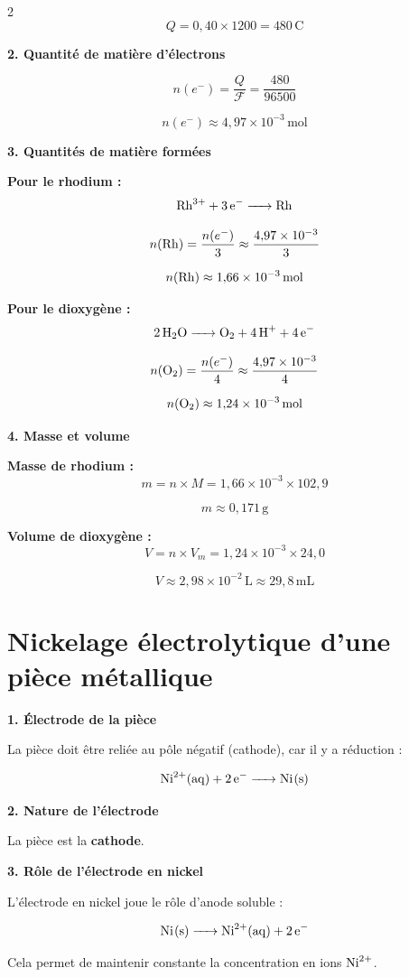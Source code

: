 \documentclass[a4paper,11pt,fleqn]{scrartcl}
\begin{document}
\begin{multicols}{2}
\[
Q = 0{,}40 \times 1200 = 480\,\text{C}
\]

\textbf{2. Quantité de matière d’électrons}

\[
n(e^-) = \frac{Q}{\mathcal{F}} = \frac{480}{96500}
\]

\[
n(e^-) \approx 4{,}97 \times 10^{-3}\,\text{mol}
\]

\textbf{3. Quantités de matière formées}

\textbf{Pour le rhodium :}
\[
\ce{Rh^{3+} + 3e^- -> Rh}
\]

\[
n(\ce{Rh}) = \frac{n(e^-)}{3} \approx \frac{4{,}97 \times 10^{-3}}{3}
\]

\[
n(\ce{Rh}) \approx 1{,}66 \times 10^{-3}\,\text{mol}
\]

\textbf{Pour le dioxygène :}
\[
\ce{2H2O -> O2 + 4H+ + 4e^-}
\]

\[
n(\ce{O2}) = \frac{n(e^-)}{4} \approx \frac{4{,}97 \times 10^{-3}}{4}
\]

\[
n(\ce{O2}) \approx 1{,}24 \times 10^{-3}\,\text{mol}
\]

\textbf{4. Masse et volume}

\textbf{Masse de rhodium :}
\[
m = n \times M = 1{,}66 \times 10^{-3} \times 102{,}9
\]

\[
m \approx 0{,}171\,\text{g}
\]

\textbf{Volume de dioxygène :}
\[
V = n \times V_m = 1{,}24 \times 10^{-3} \times 24{,}0
\]

\[
V \approx 2{,}98 \times 10^{-2}\,\text{L} \approx 29{,}8\,\text{mL}
\]

\section{Nickelage électrolytique d'une pièce métallique}

\textbf{1. Électrode de la pièce}

La pièce doit être reliée au pôle négatif (cathode), car il y a réduction :

\[
\ce{Ni^{2+}(aq) + 2e^- -> Ni(s)}
\]

\textbf{2. Nature de l’électrode}

La pièce est la \textbf{cathode}.

\textbf{3. Rôle de l’électrode en nickel}

L’électrode en nickel joue le rôle d’anode soluble :

\[
\ce{Ni(s) -> Ni^{2+}(aq) + 2e^-}
\]

Cela permet de maintenir constante la concentration en ions $\ce{Ni^{2+}}$.


\end{multicols}
\end{document}

